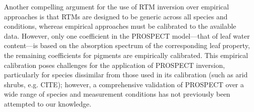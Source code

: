 % 
% 
Another compelling argument for the use of RTM inversion over empirical approaches is that RTMs are designed to be generic across all species and conditions, whereas empirical approaches must be calibrated to the available data.
% 
% 
% 
% 
However, only one coefficient in the PROSPECT model---that of leaf water content---is based on the absorption spectrum of the corresponding leaf property, the remaining coefficients for pigments are empirically calibrated.
% 
% 
This empirical calibration poses challenges for the application of PROSPECT inversion, particularly for species dissimilar from those used in its calibration (such as arid shrubs, e.g. CITE); however, a comprehensive validation of PROSPECT over a wide range of species and measurement conditions has not previously been attempted to our knowledge.
% 
% 
% 

